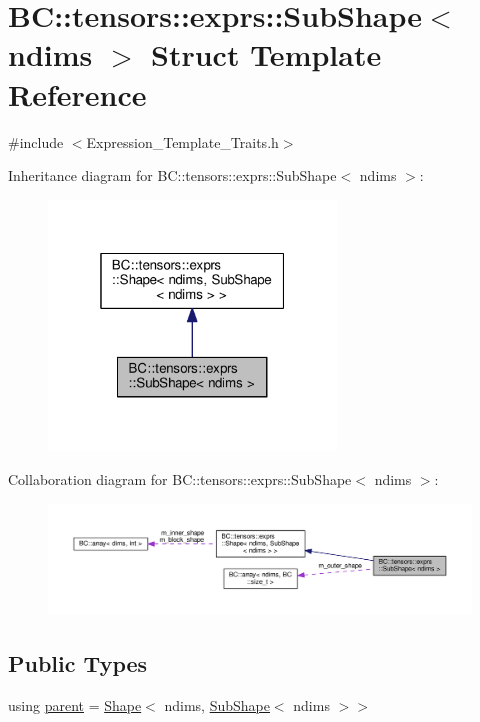 \hypertarget{classBC_1_1tensors_1_1exprs_1_1SubShape}{}\section{BC\+:\+:tensors\+:\+:exprs\+:\+:Sub\+Shape$<$ ndims $>$ Struct Template Reference}
\label{classBC_1_1tensors_1_1exprs_1_1SubShape}


{\ttfamily \#include $<$Expression\+\_\+\+Template\+\_\+\+Traits.\+h$>$}



Inheritance diagram for BC\+:\+:tensors\+:\+:exprs\+:\+:Sub\+Shape$<$ ndims $>$\+:
\nopagebreak
\begin{figure}[H]
\begin{center}
\leavevmode
\includegraphics[width=217pt]{classBC_1_1tensors_1_1exprs_1_1SubShape__inherit__graph}
\end{center}
\end{figure}


Collaboration diagram for BC\+:\+:tensors\+:\+:exprs\+:\+:Sub\+Shape$<$ ndims $>$\+:
\nopagebreak
\begin{figure}[H]
\begin{center}
\leavevmode
\includegraphics[width=350pt]{classBC_1_1tensors_1_1exprs_1_1SubShape__coll__graph}
\end{center}
\end{figure}
\subsection*{Public Types}
\begin{DoxyCompactItemize}
\item 
using \hyperlink{classBC_1_1tensors_1_1exprs_1_1SubShape_ad46bda04032a2a649162c80ee78f2a46}{parent} = \hyperlink{classBC_1_1tensors_1_1exprs_1_1Shape}{Shape}$<$ ndims, \hyperlink{classBC_1_1tensors_1_1exprs_1_1SubShape}{Sub\+Shape}$<$ ndims $>$$>$
\end{DoxyCompactItemize}
